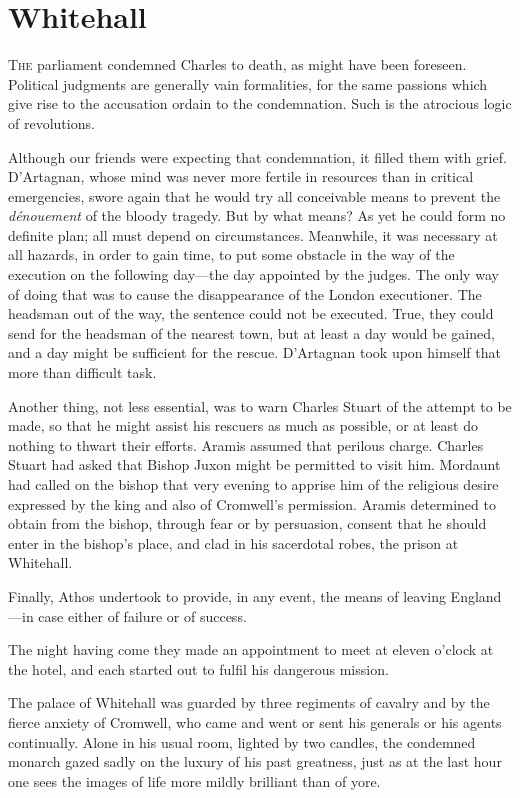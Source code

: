 \chapter{Whitehall}

 \lettrine{T}{he} parliament condemned Charles to death, as might have been foreseen. Political judgments are generally vain formalities, for the same passions which give rise to the accusation ordain to the condemnation. Such is the atrocious logic of revolutions.

Although our friends were expecting that condemnation, it filled them with grief. D'Artagnan, whose mind was never more fertile in resources than in critical emergencies, swore again that he would try all conceivable means to prevent the \textit{dénouement} of the bloody tragedy. But by what means? As yet he could form no definite plan; all must depend on circumstances. Meanwhile, it was necessary at all hazards, in order to gain time, to put some obstacle in the way of the execution on the following day—the day appointed by the judges. The only way of doing that was to cause the disappearance of the London executioner. The headsman out of the way, the sentence could not be executed. True, they could send for the headsman of the nearest town, but at least a day would be gained, and a day might be sufficient for the rescue. D'Artagnan took upon himself that more than difficult task.

Another thing, not less essential, was to warn Charles Stuart of the attempt to be made, so that he might assist his rescuers as much as possible, or at least do nothing to thwart their efforts. Aramis assumed that perilous charge. Charles Stuart had asked that Bishop Juxon might be permitted to visit him. Mordaunt had called on the bishop that very evening to apprise him of the religious desire expressed by the king and also of Cromwell's permission. Aramis determined to obtain from the bishop, through fear or by persuasion, consent that he should enter in the bishop's place, and clad in his sacerdotal robes, the prison at Whitehall.

Finally, Athos undertook to provide, in any event, the means of leaving England—in case either of failure or of success.

The night having come they made an appointment to meet at eleven o'clock at the hotel, and each started out to fulfil his dangerous mission.

The palace of Whitehall was guarded by three regiments of cavalry and by the fierce anxiety of Cromwell, who came and went or sent his generals or his agents continually. Alone in his usual room, lighted by two candles, the condemned monarch gazed sadly on the luxury of his past greatness, just as at the last hour one sees the images of life more mildly brilliant than of yore.

